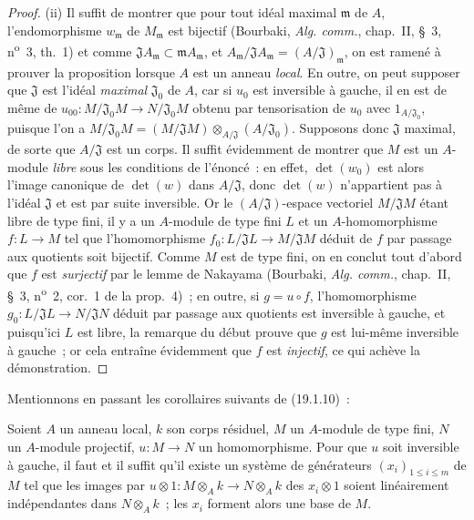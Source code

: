 \begin{proof}
(ii) Il suffit de montrer que pour tout idéal maximal $\mathfrak m$ de $A$,
l'endomorphisme $w_{\mathfrak m}$ de $M_{\mathfrak m}$ est bijectif
(Bourbaki, \emph{Alg. comm.}, chap.~II, §~3, n\textsuperscript{o}~3, th.~1)
et comme $\mathfrak JA_{\mathfrak m}\subset\mathfrak mA_{\mathfrak m}$, et
$A_{\mathfrak m}/\mathfrak JA_{\mathfrak m}=(A/\mathfrak J)_{\mathfrak m}$,
on est ramené à prouver la proposition lorsque $A$ est un anneau \emph{local}. En
outre, on peut supposer que $\mathfrak J$ est l'idéal \emph{maximal}
$\mathfrak J_0$ de $A$, car si $u_0$ est inversible
à gauche, il en est de même de
$u_{00}:M/\mathfrak J_0M\to N/\mathfrak J_0M$ obtenu par tensorisation de
$u_0$ avec $1_{A/\mathfrak J_0}$, puisque l'on a
$M/\mathfrak J_0M=(M/\mathfrak JM)\otimes_{A/\mathfrak J}(A/\mathfrak J_0)$.
Supposons donc $\mathfrak J$ maximal, de sorte que $A/\mathfrak J$ est un
corps. Il suffit évidemment de montrer que $M$ est un $A$-module \emph{libre}
sous les conditions de l'énoncé~: en effet, $\det(w_0)$ est alors l'image
canonique de $\det(w)$ dans $A/\mathfrak J$, donc $\det(w)$ n'appartient pas à
l'idéal $\mathfrak J$ et est par suite inversible. Or le
$(A/\mathfrak J)$-espace vectoriel $M/\mathfrak JM$ étant libre de type fini,
il y a un $A$-module de type fini $L$ et un $A$-homomorphisme $f:L\to M$ tel
que l'homomorphisme $f_0:L/\mathfrak JL\to M/\mathfrak JM$ déduit de $f$ par
passage aux quotients soit bijectif. Comme $M$ est de type fini, on en conclut
tout d'abord que $f$ est \emph{surjectif} par le lemme de Nakayama (Bourbaki,
\emph{Alg. comm.}, chap.~II, §~3, n\textsuperscript{o}~2, cor.~1 de la
prop.~4)~; en outre, si $g=u\circ f$, l'homomorphisme
$g_0:L/\mathfrak JL\to N/\mathfrak JN$ déduit par passage aux quotients est
inversible à gauche, et puisqu'ici $L$ est libre, la remarque du début prouve
que $g$ est lui-même inversible à gauche~; or cela entraîne évidemment que
$f$ est \emph{injectif}, ce qui achève la démonstration.
\end{proof}

Mentionnons en passant les corollaires suivants de (19.1.10)~:

\begin{corollary}[19.1.11]
\label{0.19.1.11-fr}
Soient $A$ un anneau local, $k$ son corps résiduel, $M$ un $A$-module de type
fini, $N$ un $A$-module projectif, $u:M\to N$ un homomorphisme. Pour que $u$
soit inversible à gauche, il faut et il suffit qu'il existe un système de
générateurs $(x_i)_{1\leq i\leq m}$ de $M$ tel que les images par
$u\otimes 1:M\otimes_Ak\to N\otimes_Ak$ des $x_i\otimes1$ soient linéairement
indépendantes dans $N\otimes_Ak$~; les $x_i$ forment alors une base de $M$.
\end{corollary}


